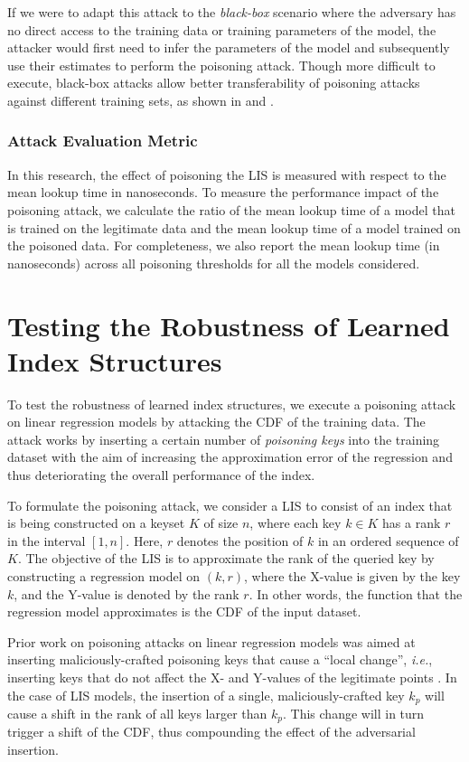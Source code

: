 \documentclass[sigconf]{acmart}
\newcommand{\ie}[0]{\emph{i.e.},\xspace}
\begin{document}
If we were to adapt this attack to the \textit{black-box} scenario where the adversary has no direct access to the training data or training parameters of the model, the attacker would first need to infer the parameters of the model and subsequently use their estimates to perform the poisoning attack. Though more difficult to execute, black-box attacks allow better transferability of poisoning attacks against different training sets, as shown in \cite{RN706} and \cite{RN705}.

\subsubsection{Attack Evaluation Metric}
\label{sec:attack_evaluation_metric}
In this research, the effect of poisoning the \ac{LIS} is measured with respect to the mean lookup time in nanoseconds. To measure the performance impact of the poisoning attack, we calculate the ratio of the mean lookup time of a model that is trained on the legitimate data and the mean lookup time of a model trained on the poisoned data.
For completeness, we also report the mean lookup time (in nanoseconds) across all poisoning thresholds for all the models considered.


\section{Testing the Robustness of Learned Index Structures}

To test the robustness of learned index structures, we execute a poisoning attack on linear regression models by attacking the \ac{CDF} of the training data. The attack works by inserting a certain number of \textit{poisoning keys} into the training dataset with the aim of increasing the approximation error of the regression and thus deteriorating the overall performance of the index.

To formulate the poisoning attack, we consider a \ac{LIS} to consist of an index that is being constructed on a keyset $K$ of size $n$, where each key $k \in K$ has a rank $r$ in the interval $[1, n]$. Here, $r$ denotes the position of $k$ in an ordered sequence of $K$. The objective of the \ac{LIS} is to approximate the rank of the queried key by constructing a regression model on $(k, r)$, where the X-value is given by the key $k$, and the Y-value is denoted by the rank $r$. In other words, the function that the regression model approximates is the \ac{CDF} of the input dataset.

Prior work on poisoning attacks on linear regression models was aimed at inserting maliciously-crafted poisoning keys that cause a \enquote{local change}, \ie inserting keys that do not affect the X- and Y-values of the legitimate points \cite{RN461}. In the case of \ac{LIS} models, the insertion of a single, maliciously-crafted key $k_p$ will cause a shift in the rank of all keys larger than $k_p$. This change will in turn trigger a shift of the \ac{CDF}, thus compounding the effect of the adversarial insertion.
\end{document}
